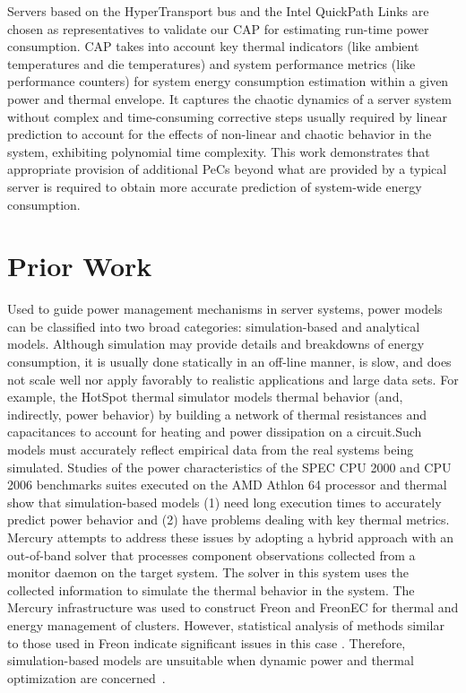 \documentclass[prodmode,acmtaco,pdftex]{acmsmall}
\begin{document}
Servers based on the HyperTransport bus \cite{HT2008} and the Intel
QuickPath Links \cite{Intel2009} are chosen as representatives to validate
our CAP for estimating run-time power consumption.  CAP takes into
account key thermal indicators (like ambient temperatures and die
temperatures) and system performance metrics (like performance counters)
for system energy consumption estimation within a given power and
thermal envelope. It captures the chaotic dynamics of a server system
without complex and time-consuming corrective steps usually required by
linear prediction to account for the effects of non-linear and chaotic
behavior in the system, exhibiting polynomial time complexity.  This
work demonstrates that appropriate provision of additional PeCs beyond
what are provided by a typical server is required to obtain more
accurate prediction of system-wide energy consumption.

\section{Prior Work}
\label{sec:priorwork}
Used to guide power management mechanisms in server systems, power
models can be classified into two broad categories: simulation-based and
analytical models. Although simulation may provide details and
breakdowns of energy consumption, it is usually done statically in an
off-line manner, is slow, and does not scale well nor apply favorably to
realistic applications and large data sets. For example, the HotSpot
thermal simulator \cite{Skadron2004} models thermal behavior (and,
indirectly, power behavior) by building a network of thermal resistances
and capacitances to account for heating and power dissipation on a
circuit.Such models must accurately reflect empirical data from the real
systems being simulated. Studies of the power characteristics of the
SPEC CPU 2000 and CPU 2006 benchmarks suites executed on the AMD Athlon
64 processor \cite{MesaMartinez2007} and thermal \cite{MesaMartinez2010}
show that simulation-based models (1) need long execution times to
accurately predict power behavior and (2) have problems dealing with key
thermal metrics.  Mercury \cite{Heath2006} attempts to address these
issues by adopting a hybrid approach with an out-of-band solver that
processes component observations collected from a monitor daemon on the
target system.  The solver in this system uses the collected information
to simulate the thermal behavior in the system.  The Mercury
infrastructure was used to construct Freon and FreonEC for thermal and
energy management of clusters. However, statistical analysis of methods
similar to those used in Freon indicate significant issues in this case
\cite{DavisRivoire2011}. Therefore, simulation-based models are unsuitable when dynamic
power and thermal optimization are concerned~\cite{Economou2006}.
 
\end{document}
